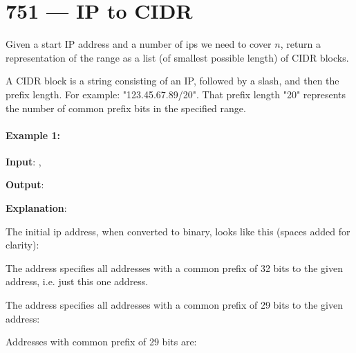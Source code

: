 \section{751 --- IP to CIDR}
Given a start IP address  and a number of ips we need to cover $n$, return a representation of the range as a list (of smallest possible length) of CIDR blocks.

A CIDR block is a string consisting of an IP, followed by a slash, and then the prefix length. For example: "123.45.67.89/20". That prefix length "20" represents the number of common prefix bits in the specified range.

\paragraph{Example 1:}
\begin{flushleft}

\textbf{Input}: , 

\textbf{Output}: \fcj{["255.0.0.7/32","255.0.0.8/29","255.0.0.16/32"]}

\textbf{Explanation}:

The initial ip address, when converted to binary, looks like this (spaces added for clarity):


The address  specifies all addresses with a common prefix of 32 bits to the given address, i.e. just this one address.

The address  specifies all addresses with a common prefix of 29 bits to the given address:


Addresses with common prefix of 29 bits are:











\end{flushleft}
